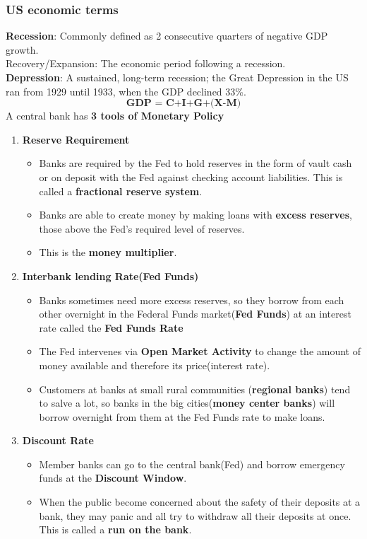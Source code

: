 \documentclass{article}
\theoremstyle{definition}
\theoremstyle{thrm}
\theoremstyle{lma}
\theoremstyle{ppst}
\theoremstyle{crlr}
\begin{document}
\subsubsection{US economic terms}
\textbf{Recession}: Commonly defined as 2 consecutive quarters of negative GDP growth. \\
Recovery/Expansion: The economic period following a recession.\\
\textbf{Depression}: A sustained, long-term recession; the Great Depression in the US ran from 1929 until 1933, when the GDP declined 33\%.\\
\begin{equation*}
	\textbf{GDP = C+I+G+(X-M)}
\end{equation*}
A central bank has \textbf{3 tools of Monetary Policy}
\begin{enumerate}
	\item \textbf{Reserve Requirement}
	\begin{itemize}
		\item Banks are required by the Fed to hold reserves in the form of vault cash or on deposit with the Fed against checking account liabilities. This is called a \textbf{fractional reserve system}.
		\item Banks are able to create money by making loans with \textbf{excess reserves}, those above the Fed's required level of reserves.
		\item This is the \textbf{money multiplier}.
	\end{itemize} 
	\item \textbf{Interbank lending Rate(Fed Funds)}
	\begin{itemize}
		\item Banks sometimes need more excess reserves, so they borrow from each other overnight in the Federal Funds market(\textbf{Fed Funds}) at an interest rate called the \textbf{Fed Funds Rate}
		\item The Fed intervenes via \textbf{Open Market Activity} to change the amount of money available and therefore its price(interest rate).
		\item Customers at banks at small rural communities (\textbf{regional banks}) tend to salve a lot, so banks in the big cities(\textbf{money center banks}) will borrow overnight from them at the Fed Funds rate to make loans.  
	\end{itemize}
	\item \textbf{Discount Rate}
	\begin{itemize}
		\item Member banks can go to the central bank(Fed) and borrow emergency funds at the \textbf{Discount Window}.
		\item When the public become concerned about the safety of their deposits at a bank, they may panic and all try to withdraw all their deposits at once. This is called a \textbf{run on the bank}.
	\end{itemize}
\end{enumerate}
\end{document}
